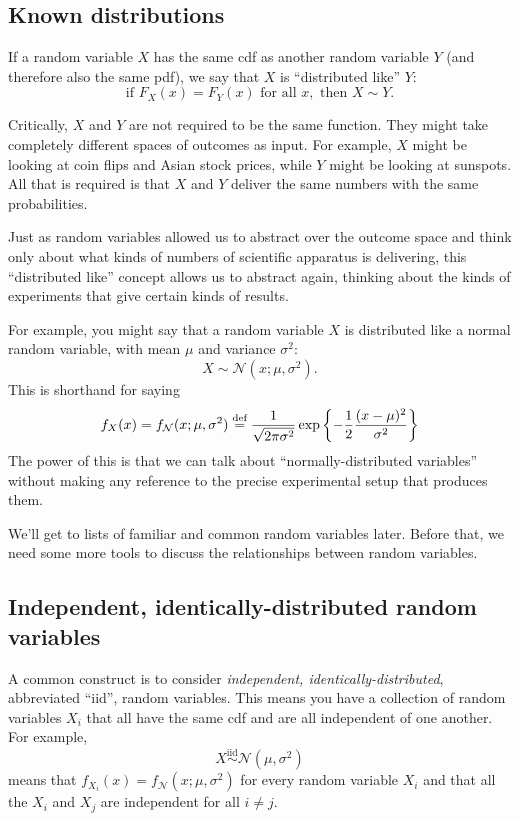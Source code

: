 \subsection{Known distributions}

If a random variable $X$ has the same cdf as another random variable $Y$ (and
therefore also the same pdf), we say that $X$ is ``distributed like'' $Y$:
$$
\text{if } F_X(x) = F_Y(x) \text{ for all } x, \text{ then } X \sim Y.
$$

Critically, $X$ and $Y$ are not required to be the same function. They might
take completely different spaces of outcomes as input. For example, $X$ might
be looking at coin flips and Asian stock prices, while $Y$ might be looking at
sunspots. All that is required is that $X$ and $Y$ deliver the same numbers
with the same probabilities.

Just as random variables allowed us to abstract over the outcome space and
think only about what kinds of numbers of scientific apparatus is delivering,
this ``distributed like'' concept allows us to abstract again, thinking about
the kinds of experiments that give certain kinds of results.

For example, you might say that a random variable $X$ is distributed like a
normal random variable, with mean $\mu$ and variance $\sigma^2$:
$$
X \sim \mathcal{N}(x; \mu, \sigma^2).
$$
This is shorthand for saying
\begin{equation*}
f_X(x) = f_\mathcal{N}(x; \mu, \sigma^2) \stackrel{\text{def}}{=}
  \frac{1}{\sqrt{2\pi\sigma^2}} \exp \left\{-\frac{1}{2} \frac{(x-\mu)^2}{\sigma^2} \right\}
\end{equation*}
The power of this is that we can talk about ``normally-distributed variables''
without making any reference to the precise experimental setup that produces
them.

We'll get to lists of familiar and common random variables later. Before that,
we need some more tools to discuss the relationships between random variables.

\subsection{Independent, identically-distributed random variables}

A common construct is to consider \emph{independent, identically-distributed},
abbreviated ``iid'', random variables. This means you have a collection of
random variables $X_i$ that all have the same cdf and are all independent of
one another. For example,
\begin{equation*}
X \stackrel{\text{iid}}{\sim} \mathcal{N}(\mu, \sigma^2)
\end{equation*}
means that $f_{X_i}(x) = f_\mathcal{N}(x; \mu, \sigma^2)$ for every random variable
$X_i$ and that all the $X_i$ and $X_j$ are independent for all $i \neq j$.

